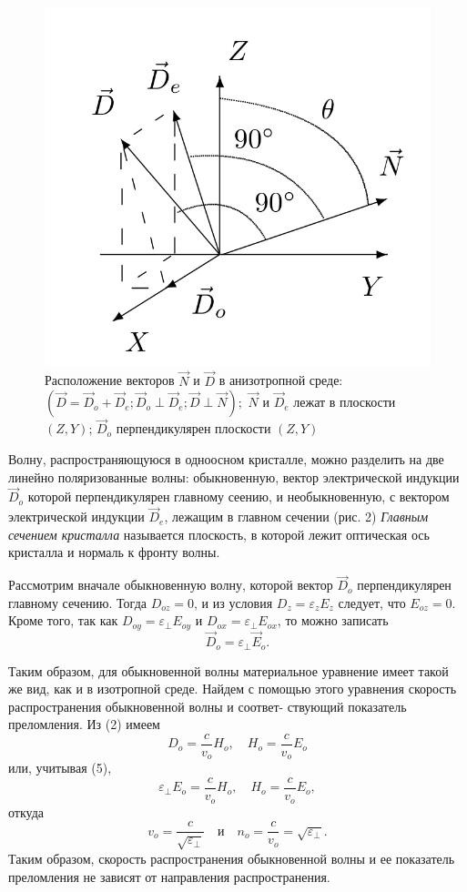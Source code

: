 \documentclass[10pt, a4paper]{article}
\begin{document}
\begin{figure}
    \centering
    \includegraphics[width=1\textwidth]{DN.png}
    \caption{Расположение векторов $\vec N$ и $\vec D$ в анизотропной среде: $(\vec D = \vec D_o + \vec D_e; \vec D_o \perp \vec D_e; \vec D \perp \vec N);$ $\vec N$ и $\vec D_e$ лежат в плоскости $(Z, Y)$; $\vec D_o$ перпендикулярен плоскости $(Z, Y)$}
\end{figure} 
Волну, распространяющуюся в одноосном кристалле, можно разделить на две линейно поляризованные волны: обыкновенную, вектор электрической индукции $\vec D_o$ которой перпендикулярен главному сеению, и необыкновенную, с вектором электрической индукции $\vec D_e$, лежащим в главном сечении (рис. 2) \textit{Главным сечением кристалла} называется плоскость, в которой лежит оптическая ось кристалла и нормаль к фронту волны.

Рассмотрим вначале обыкновенную волну, которой вектор $\vec D_o$ перпендикулярен главному сечению. Тогда $D_{oz} = 0$, и из условия $D_z = \varepsilon_z E_z$ следует, что $E_{oz} = 0.$ Кроме того, так как $D_{oy} = \varepsilon_\perp E_{oy}$ и $D_{ox} = \varepsilon_\perp E_{ox}$, то можно записать 
\begin{equation}
	\vec D_o = \varepsilon_\perp \vec E_o.
\end{equation}

Таким образом, для обыкновенной волны материальное уравнение
имеет такой же вид, как и в изотропной среде. Найдем с помощью этого
уравнения скорость распространения обыкновенной волны и соответ-
ствующий показатель преломления. Из (2) имеем
\[
	D_o = \frac{c}{v_o} H_o, \quad H_o = \frac{c}{v_o} E_o
\]
или, учитывая (5),
\[
	\varepsilon_{\perp} E_o = \frac{c}{v_o} H_o, \quad H_o = \frac{c}{v_o} E_o,
\]
откуда
\[
	v_o = \frac{c}{ \sqrt{\varepsilon_{\perp}}} \quad \text{и} \quad n_o = \frac{c}{v_o} = \sqrt{\varepsilon_\perp}.
\]
Таким образом, скорость распространения обыкновенной волны и ее показатель преломления не зависят от направления распространения.
\end{document}
